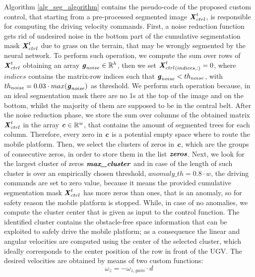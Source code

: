\documentclass[journal]{IEEEtran}
\begin{document}
Algorithm \ref{alg_seg_algorithm} contains the pseudo-code of the proposed custom control, that starting from a pre-processed segmented image $\textbf{\textit{X}}_{ctrl}^{t}$, is responsible for computing the driving velocity commands. First, a noise reduction function gets rid of undesired noise in the bottom part of the cumulative segmentation mask $\textbf{\textit{X}}_{ctrl}^{t}$ due to grass on the terrain, that may be wrongly segmented by the neural network. To perform such operation, we compute the sum over rows of $\textbf{\textit{X}}_{ctrl}^{t}$ obtaining an array $\textbf{\textit{g}}_{noise}\in\mathbb{R}^{h}$, then we set ${\textbf{\textit{X}}_{ctrl}^{t}}_{(indices,:)}=0$, where $indices$ contains the matrix-row indices such that $\textbf{\textit{g}}_{noise}<{th}_{noise}$, with ${th}_{noise}=0.03 \cdot max(\textbf{\textit{g}}_{noise})$ as threshold. We perform such operation because, in an ideal segmentation mask there are no 1s at the top of the image and on the bottom, whilst the majority of them are supposed to be in the central belt.
After the noise reduction phase, we store the sum over columns of the obtained matrix $\textbf{\textit{X}}_{ctrl}^{t}$ in the array $\textbf{\textit{c}}\in  \mathbb{R}^{w}$, that contains the amount of segmented trees for each column. Therefore, every zero in $\textbf{\textit{c}}$ is a potential empty space where to route the mobile platform.
Then, we select the clusters of zeros in $\textbf{\textit{c}}$, which are the groups of consecutive zeros, in order to store them in the list $\textbf{\textit{zeros}}$.
Next, we look for the largest cluster of zeros $\textbf{\textit{max\_cluster}}$ and in case of the length of such cluster is over an empirically chosen threshold, $anomaly\_th=0.8\cdot w$, the driving commands are set to zero value, because it means the provided cumulative segmentation mask $\textbf{\textit{X}}_{ctrl}^{t}$ has more zeros than ones, that is an anomaly, so for safety reason the mobile platform is stopped. While, in case of no anomalies, we compute the cluster center that is given as input to the control function.
The identified cluster contains the obstacle-free space information that can be exploited to safely drive the mobile platform; as a consequence the linear and angular velocities are computed using the center of the selected cluster, which ideally corresponds to the center position of the row in front of the UGV. The desired velocities are obtained by means of two custom functions:
\begin{equation}
\label{eq1}
\omega_z =- \omega_{z,gain}  \cdot d
\end{equation}
\end{document}
